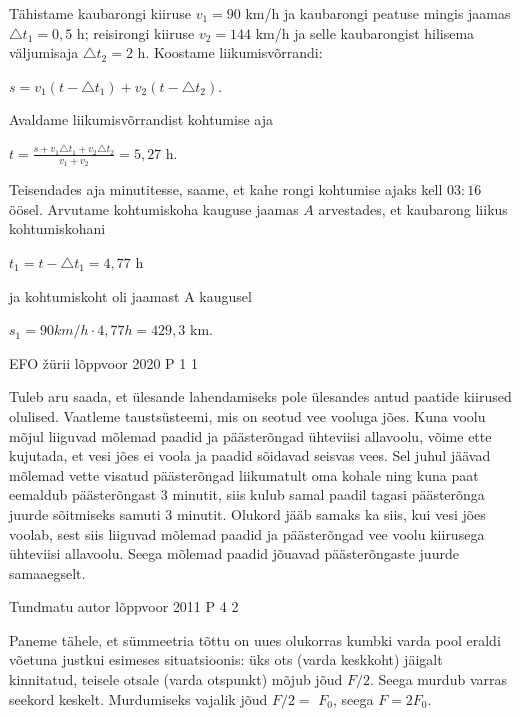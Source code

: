 \documentclass[11pt]{article}
\begin{document}
{{\ifSolution
Tähistame kaubarongi kiiruse $v_1 = 90$ km/h ja kaubarongi peatuse mingis jaamas $\triangle t_1 = 0,5$ h; reisirongi kiiruse $v_2 = 144$ km/h ja selle kaubarongist hilisema väljumisaja $\triangle t_2 = 2$ h.
\newline
Koostame liikumisvõrrandi:
\begin{center}
$s = v_1(t - \triangle t_1) + v_2 (t - \triangle t_2)$.
\end{center}
Avaldame liikumisvõrrandist kohtumise aja
\begin{center}
$t = \frac{s + v_1 \triangle t_1 + v_2 \triangle t_2}{v_1 + v_2} = 5,27$ h.
\end{center}
Teisendades aja minutitesse, saame, et kahe rongi kohtumise ajaks kell $03:16$ öösel. 
\newline
Arvutame kohtumiskoha kauguse jaamas $A$ arvestades, et kaubarong liikus kohtumiskohani
\begin{center}
$t_1 = t - \triangle t_1 = 4,77$ h
\end{center}
ja kohtumiskoht oli jaamast A kaugusel
\begin{center}
$s_1 = 90 km/h \cdot 4,77 h = 429,3$ km.
\end{center}
\fi
}

{EFO žürii} %
{lõppvoor} %
{2020} %
{P 1} %
{1} %
{

\ifSolution
Tuleb aru saada, et ülesande lahendamiseks pole ülesandes antud paatide kiirused olulised. Vaatleme taustsüsteemi, mis on seotud vee vooluga jões. Kuna voolu mõjul liiguvad mõlemad paadid ja päästerõngad ühteviisi allavoolu, võime ette kujutada, et vesi jões ei voola ja paadid sõidavad seisvas vees. Sel juhul jäävad mõlemad vette visatud päästerõngad liikumatult oma kohale ning kuna paat eemaldub päästerõngast $3$ minutit, siis kulub samal paadil tagasi päästerõnga juurde sõitmiseks samuti $3$ minutit. Olukord jääb samaks ka siis, kui vesi jões voolab, sest siis liiguvad mõlemad paadid ja päästerõngad vee voolu kiirusega ühteviisi allavoolu. Seega mõlemad paadid jõuavad päästerõngaste juurde samaaegselt.
\fi
}


{Tundmatu autor} %
{lõppvoor} %
{2011} %
{P 4} %
{2} %
{

\ifSolution
Paneme tähele, et sümmeetria tõttu on uues olukorras kumbki varda pool eraldi võetuna justkui esimeses situatsioonis: üks ots (varda keskkoht) jäigalt kinnitatud, teisele otsale (varda otspunkt) mõjub jõud $F/2$. Seega murdub varras seekord keskelt. Murdumiseks vajalik jõud $F/2 =$ $F_0$, seega $F = 2F_0$.
\fi
}


}
\end{document}

